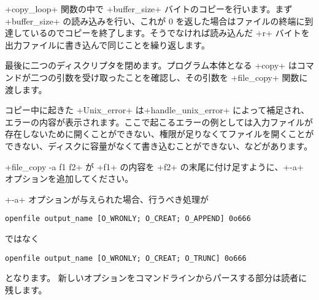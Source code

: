 \ml+copy_loop+ 関数の中で \ml+buffer_size+ バイトのコピーを行います。まず\ml+buffer_size+ の読み込みを行い、これが 0 を返した場合はファイルの終端に到達しているのでコピーを終了します。そうでなければ読み込んだ \ml+r+ バイトを出力ファイルに書き込んで同じことを繰り返します。

最後に二つのディスクリプタを閉めます。プログラム本体となる \ml+copy+ はコマンドが二つの引数を受け取ったことを確認し、その引数を \ml+file_copy+ 関数に渡します。

コピー中に起きた \ml+Unix_error+ は\ml+handle_unix_error+ によって補足され、エラーの内容が表示されます。ここで起こるエラーの例としては入力ファイルが存在しないために開くことができない、権限が足りなくてファイルを開くことができない、ディスクに容量がなくて書き込むことができない、などがあります。


\begin{exercise}
\ml+file_copy -a f1 f2+ が \ml+f1+ の内容を \ml+f2+ の末尾に付け足すように、\ml+-a+ オプションを追加してください。
\end{exercise}
\begin{answer}
\ml+-a+ オプションが与えられた場合、行うべき処理が
%
\begin{lstlisting}
openfile output_name [O_WRONLY; O_CREAT; O_APPEND] 0o666
\end{lstlisting}
%
ではなく
%
\begin{lstlisting}
openfile output_name [O_WRONLY; O_CREAT; O_TRUNC] 0o666
\end{lstlisting}
%
となります。 新しいオプションをコマンドラインからパースする部分は読者に残します。
\end{answer}

